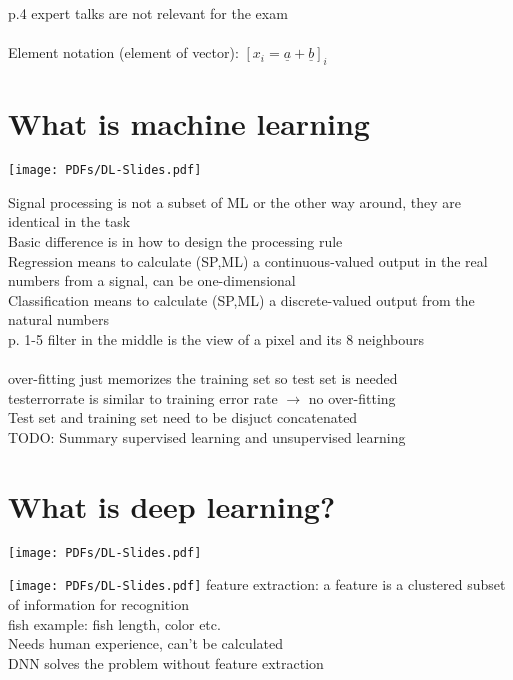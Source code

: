 \textbullet p.4 expert talks are not relevant for the exam \\
 \\
\textbullet Element notation (element of vector): $ [x_i = \underline{a} + \underline{b}]_i$
\section{What is machine learning}
\texttt{[image: PDFs/DL-Slides.pdf]}

\textbullet Signal processing is not a subset of ML or the other way around, they are identical in the task \\
\textbullet Basic difference is in how to design the processing rule \\
\textbullet Regression means to calculate (SP,ML) a continuous-valued output in the real numbers from a signal, can be one-dimensional \\
\textbullet Classification means to calculate (SP,ML) a discrete-valued output from the natural numbers \\
\textbullet p. 1-5 filter in the middle is the view of a pixel and its 8 neighbours \\
 \\
\textbullet over-fitting just memorizes the training set so test set is needed \\
\textbullet testerrorrate is similar to training error rate $\rightarrow$ no over-fitting \\
\textbullet Test set and training set need to be disjuct concatenated \\
\textbullet TODO: Summary supervised learning and unsupervised learning
\section{What is deep learning?}
\texttt{[image: PDFs/DL-Slides.pdf]}

\texttt{[image: PDFs/DL-Slides.pdf]}
\textbullet feature extraction: a feature is a clustered subset of information for recognition \\
\textbullet fish example: fish length, color etc. \\
\qquad \textbullet Needs human experience, can't be calculated \\
\qquad \textbullet DNN solves the problem without feature extraction
